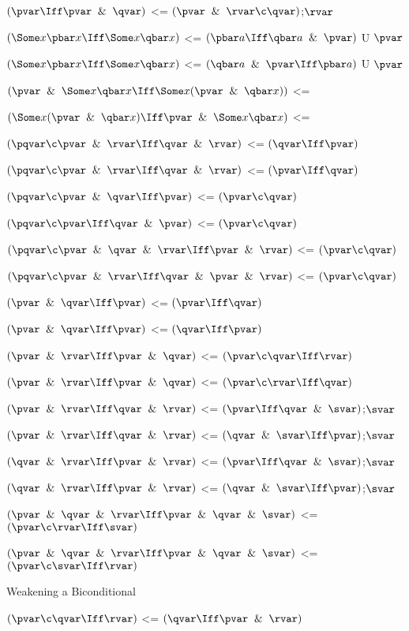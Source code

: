 $(\pvar \Iff \pvar \And \qvar)$ <= $(\pvar \And \rvar \c \qvar)$;$\rvar$

$(\Some x \pbar x \Iff \Some x \qbar x)$ <= $(\pbar a \Iff \qbar a \And \pvar)$ U $\pvar$

$(\Some x \pbar x \Iff \Some x \qbar x)$ <= $(\qbar a \And \pvar \Iff \pbar a)$ U $\pvar$

$(\pvar \And \Some x \qbar x \Iff \Some x (\pvar \And \qbar x))$ <= 

$( \Some x (\pvar \And \qbar x)\Iff\pvar \And \Some x \qbar x ) $ <= 

$(\pqvar \c \pvar \And \rvar \Iff\qvar\And \rvar)$ <= $(\qvar\Iff \pvar)$

$(\pqvar \c \pvar \And \rvar \Iff\qvar\And \rvar)$ <= $(\pvar\Iff \qvar)$

$(\pqvar \c \pvar \And \qvar \Iff\pvar)$ <= $(\pvar\c \qvar)$

$(\pqvar \c \pvar \Iff\qvar\And \pvar)$ <= $(\pvar\c \qvar)$

$(\pqvar \c \pvar \And \qvar \And \rvar\Iff\pvar\And \rvar)$ <= $(\pvar\c \qvar)$

$(\pqvar \c \pvar\And \rvar \Iff\qvar\And \pvar\And \rvar)$ <= $(\pvar\c \qvar)$

$(\pvar \And \qvar \Iff \pvar)$ <= $(\pvar \Iff \qvar)$

$(\pvar \And \qvar \Iff \pvar)$ <= $(\qvar \Iff \pvar)$

$(\pvar \And \rvar\Iff \pvar \And \qvar)$ <= $(\pvar \c \qvar \Iff \rvar)$

$(\pvar \And \rvar\Iff \pvar \And \qvar)$ <= $(\pvar \c \rvar \Iff \qvar)$

$(\pvar \And \rvar\Iff \qvar \And \rvar)$ <= $(\pvar \Iff \qvar \And \svar)$;$\svar$

$(\pvar \And \rvar\Iff \qvar \And \rvar)$ <= $(\qvar \And \svar\Iff \pvar)$;$\svar$

$(\qvar \And \rvar\Iff \pvar \And \rvar)$ <= $(\pvar \Iff \qvar \And \svar)$;$\svar$

$(\qvar \And \rvar\Iff \pvar \And \rvar)$ <= $(\qvar \And \svar\Iff \pvar)$;$\svar$

$(\pvar \And \qvar \And \rvar \Iff \pvar \And \qvar \And \svar)$ <= $(\pvar \c \rvar\Iff\svar)$

$(\pvar \And \qvar \And \rvar \Iff \pvar \And \qvar \And \svar)$ <= $(\pvar \c \svar\Iff\rvar)$
\lineb

Weakening a Biconditional

$(\pvar \c \qvar \Iff \rvar)$ <= $(\qvar \Iff \pvar \And \rvar)$

